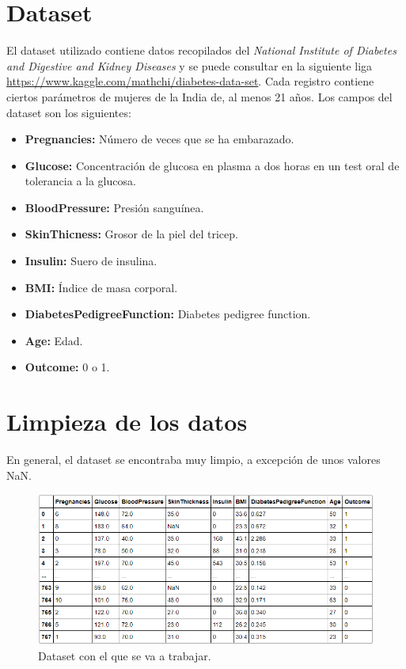 \documentclass{article}
\begin{document}
\section{Dataset}

El dataset utilizado contiene datos recopilados del \emph{National Institute of Diabetes and Digestive and Kidney Diseases} y se puede consultar en la siguiente liga \url{https://www.kaggle.com/mathchi/diabetes-data-set}. Cada registro contiene ciertos parámetros de mujeres de la India de, al menos 21 años. Los campos del dataset son los siguientes:

\begin{itemize}
	\item \textbf{Pregnancies:} Número de veces que se ha embarazado.
	\item \textbf{Glucose:} Concentración de glucosa en plasma a dos horas en un test oral de tolerancia a la glucosa. 
	\item \textbf{BloodPressure:} Presión sanguínea.
	\item \textbf{SkinThicness:} Grosor de la piel del tricep.
	\item \textbf{Insulin:} Suero de insulina.
	\item \textbf{BMI:} Índice de masa corporal.
	\item \textbf{DiabetesPedigreeFunction:} Diabetes pedigree function.
	\item \textbf{Age:} Edad.
	\item \textbf{Outcome:} 0 o 1.
\end{itemize}


\section{Limpieza de los datos}

En general, el dataset se encontraba muy limpio, a excepción de unos valores NaN.

\begin{figure}[H]
	\centering
	\includegraphics[width=0.9\linewidth]{dataset_sucio.png}
	\caption{Dataset con el que se va a trabajar.}%
	\label{fig:dataset_sucio}
\end{figure}
\end{document}
